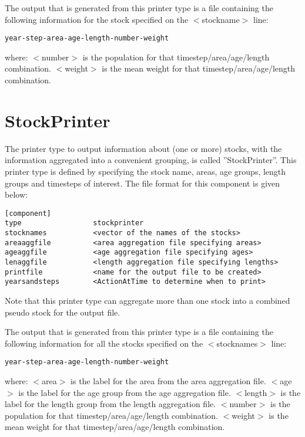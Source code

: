 \documentclass [a4paper, 10pt]{book}
\begin{document}
The output that is generated from this printer type is a file containing the following information for the stock specified on the $<$stockname$>$ line:

{\small\begin{verbatim}
year-step-area-age-length-number-weight
\end{verbatim}}

where:\newline
$<$number$>$ is the population for that timestep/area/age/length combination.\newline
$<$weight$>$ is the mean weight for that timestep/area/age/length combination.

\section{StockPrinter}\label{sec:stockprinter}
The printer type to output information about (one or more) stocks, with the information aggregated into a convenient grouping, is called ''StockPrinter''.  This printer type is defined by specifying the stock name, areas, age groups, length groups and timesteps of interest.  The file format for this component is given below:

{\small\begin{verbatim}
[component]
type                 stockprinter
stocknames           <vector of the names of the stocks>
areaaggfile          <area aggregation file specifying areas>
ageaggfile           <age aggregation file specifying ages>
lenaggfile           <length aggregation file specifying lengths>
printfile            <name for the output file to be created>
yearsandsteps        <ActionAtTime to determine when to print>
\end{verbatim}}

Note that this printer type can aggregate more than one stock into a combined pseudo stock for the output file.

\bigskip
The output that is generated from this printer type is a file containing the following information for all the stocks specified on the $<$stocknames$>$ line:

{\small\begin{verbatim}
year-step-area-age-length-number-weight
\end{verbatim}}

where:\newline
$<$area$>$ is the label for the area from the area aggregation file.\newline
$<$age$>$ is the label for the age group from the age aggregation file.\newline
$<$length$>$ is the label for the length group from the length aggregation file.\newline
$<$number$>$ is the population for that timestep/area/age/length combination.\newline
$<$weight$>$ is the mean weight for that timestep/area/age/length combination.
\end{document}
